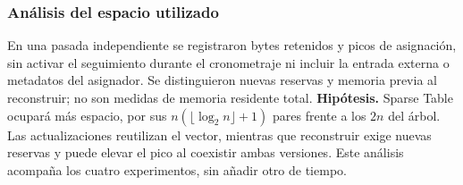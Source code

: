 \subsubsection{Análisis del espacio utilizado}

En una pasada independiente se registraron bytes retenidos y picos de
asignación, sin activar el seguimiento durante el cronometraje ni incluir
la entrada externa o metadatos del asignador. Se distinguieron nuevas reservas
y memoria previa al reconstruir; no son medidas de memoria residente total.
\textbf{Hipótesis.} Sparse Table ocupará más espacio, por sus
\(n(\lfloor\log_2 n\rfloor+1)\) pares frente a los \(2n\) del árbol.
Las actualizaciones reutilizan el vector, mientras que reconstruir exige
nuevas reservas y puede elevar el pico al coexistir ambas versiones. Este
análisis acompaña los cuatro experimentos, sin añadir otro de tiempo.
